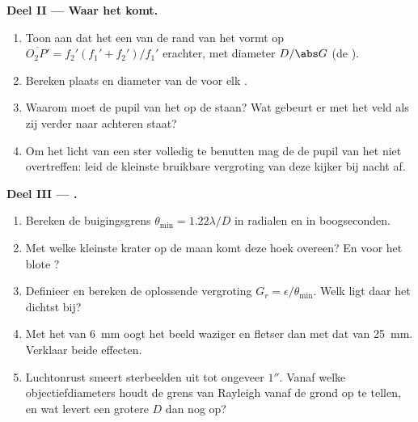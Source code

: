 \begin{problem}
\medskip
\noindent\textbf{Deel II --- Waar het  komt.}
\begin{enumerate}[resume]
  \item Toon aan dat het  een  van de rand van het 
        vormt op $\overline{O_2P'} = f_2'(f_1' + f_2')/f_1'$ erachter, met
        diameter $D/\abs G$ (de ).
  \item Bereken plaats en diameter van de  voor elk
        .
  \item Waarom moet de pupil van het  op de  staan? Wat
        gebeurt er met het veld als zij verder naar achteren staat?
  \item Om het licht van een ster volledig te benutten mag de 
        de pupil van het  niet overtreffen: leid de kleinste bruikbare
        vergroting van deze kijker bij nacht af.
\end{enumerate}

\medskip
\noindent\textbf{Deel III --- .}
\begin{enumerate}[resume]
  \item Bereken de buigingsgrens $\theta_{\min} = 1.22\lambda/D$
        in radialen en in boogseconden.
  \item Met welke kleinste krater op de maan komt deze hoek overeen? En
        voor het blote ?
  \item Definieer en bereken de oplossende vergroting $G_r =
        \epsilon/\theta_{\min}$. Welk  ligt daar het dichtst bij?
  \item Met het  van \qty{6}{mm} oogt het beeld waziger en
        fletser dan met dat van \qty{25}{mm}. Verklaar beide effecten.
  \item Luchtonrust smeert sterbeelden uit tot ongeveer $1''$. Vanaf
        welke objectiefdiameters houdt de grens van Rayleigh vanaf de
        grond op te tellen, en wat levert een grotere $D$ dan nog op?
\end{enumerate}


\end{problem}

